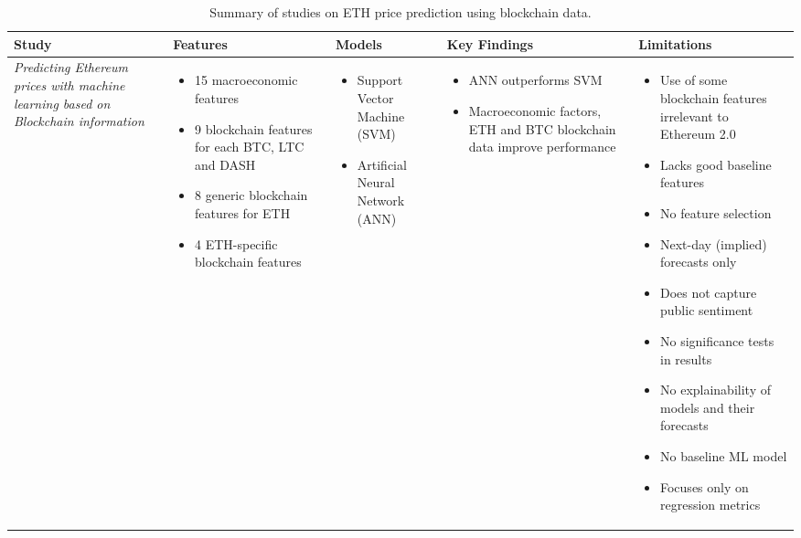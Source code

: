 \documentclass[ %
                    author={Raj Dhakan},
                supervisor={Dr. Ayush Joshi},
                    degree={MSc},
                     title={Ethereum Price Prediction using Internal and External Factors},
                  subtitle={},
                      type={},
                      year={2025}]{dissertation}
\begin{document}
\begin{landscape}
\begin{table}[h]
\centering
\small
\caption{Summary of studies on ETH price prediction using blockchain data.}
\label{tab:eth_price_comparison}
\begin{tabular}{@{}L{3.5cm} L{5cm} L{4cm} L{4.5cm} L{5.5cm}@{}}
\toprule
\textbf{Study} & \textbf{Features} & \textbf{Models} & \textbf{Key Findings} & \textbf{Limitations} \\
\midrule

\textit{Predicting Ethereum prices with machine learning based on Blockchain information \cite{RN141}} & 
\begin{itemize}[leftmargin=*, nosep]
  \item 15 macroeconomic features
  \item 9 blockchain features for each BTC, LTC and DASH
  \item 8 generic blockchain features for ETH
  \item 4 ETH-specific blockchain features
\end{itemize}
& 
\begin{itemize}[leftmargin=*, nosep]
  \item Support Vector Machine (SVM)
  \item Artificial Neural Network (ANN)
\end{itemize}
& 
\begin{itemize}[leftmargin=*, nosep]
  \item ANN outperforms SVM
  \item Macroeconomic factors, ETH and BTC blockchain data improve performance
\end{itemize}
& 
\begin{itemize}[leftmargin=*, nosep]
  \item Use of some blockchain features irrelevant to Ethereum 2.0
  \item Lacks good baseline features
  \item No feature selection
  \item Next-day (implied) forecasts only
  \item Does not capture public sentiment
  \item No significance tests in results
  \item No explainability of models and their forecasts
  \item No baseline ML model
  \item Focuses only on regression metrics
\end{itemize} \\
\midrule


\end{tabular}
\end{table}
\end{landscape}
\end{document}
